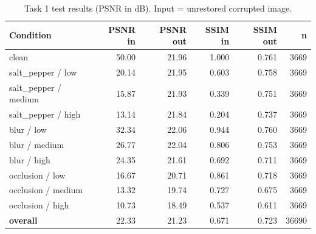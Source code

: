 \begin{table}[t]
\centering
\caption{Task 1 test results (PSNR in dB). Input = unrestored corrupted image.}
\label{tab:t1_test}
\footnotesize
\begin{tabular}{lrrrrr}
\toprule
Condition & PSNR in & PSNR out & SSIM in & SSIM out & n \\
\midrule
clean & 50.00 & 21.96 & 1.000 & 0.761 & 3669 \\
salt\_pepper / low & 20.14 & 21.95 & 0.603 & 0.758 & 3669 \\
salt\_pepper / medium & 15.87 & 21.93 & 0.339 & 0.751 & 3669 \\
salt\_pepper / high & 13.14 & 21.84 & 0.204 & 0.737 & 3669 \\
blur / low & 32.34 & 22.06 & 0.944 & 0.760 & 3669 \\
blur / medium & 26.77 & 22.04 & 0.806 & 0.753 & 3669 \\
blur / high & 24.35 & 21.61 & 0.692 & 0.711 & 3669 \\
occlusion / low & 16.67 & 20.71 & 0.861 & 0.718 & 3669 \\
occlusion / medium & 13.32 & 19.74 & 0.727 & 0.675 & 3669 \\
occlusion / high & 10.73 & 18.49 & 0.537 & 0.611 & 3669 \\
\textbf{overall} & 22.33 & 21.23 & 0.671 & 0.723 & 36690 \\
\bottomrule
\end{tabular}
\end{table}
